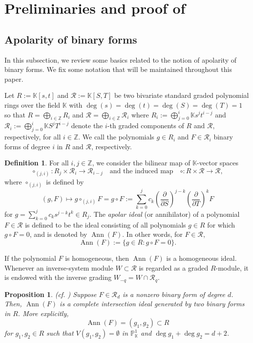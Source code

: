 \documentclass[a4paper, 11pt]{amsart}
\numberwithin{theorem}{section}
\newtheorem{proposition}[theorem]{Proposition}
\theoremstyle{definition}
\newtheorem{definition}[theorem]{Definition}
\numberwithin{equation}{section}
\DeclareMathOperator{\Ann}{\operatorname{Ann}}
\begin{document}
\section{Preliminaries and proof of }\label{sec:prel and main}
\subsection{Apolarity of binary forms}\label{subsec:apolarity}
In this subsection, we review some basics related to the notion of apolarity of binary forms. 
We fix some notation that will be maintained throughout this paper. 
 
Let $R:= \mathbb{K}[s,t]$ and $\mathcal{R}:= \mathbb{K}[S,T]$ be two bivariate standard graded polynomial rings over the field $\mathbb{K}$ with $\deg(s) = \deg(t) = \deg(S) = \deg(T) = 1$ so that $R = \bigoplus_{i\in \mathbb{Z}} R_i$ and $\mathcal{R} = \bigoplus_{i\in \mathbb{Z}} \mathcal{R}_i$ where $R_i := \bigoplus_{j = 0}^{i}\mathbb{K}s^jt^{i-j}$ and $\mathcal{R}_i := \bigoplus_{j = 0}^{i}\mathbb{K}S^jT^{i-j}$ denote the $i$-th graded components of $R$ and $\mathcal{R}$, respectively, for all $i\in \mathbb{Z}$. 
We call the polynomials $g\in R_i$ and $F \in \mathcal{R}_i$ binary forms of degree $i$ in $R$ and $\mathcal{R}$, respectively. 

\begin{definition}
For all $i,j\in \mathbb{Z}$, we consider the bilinear map of $\mathbb{K}$-vector spaces
\[
\circ_{(j,i)}:R_j\times \mathcal{R}_i \longrightarrow \mathcal{R}_{i-j} \quad\text{and the induced map}\quad \circ: R \times \mathcal{R} \longrightarrow \mathcal{R},
\]
where $\circ_{(j,i)}$ is defined by
\[
(g,F) \longmapsto g\circ_{(j,i)} F = g \circ F := \sum_{k=0}^j c_k\left(\frac{\partial}{\partial S}\right)^{j-k}\left(\frac{\partial}{\partial T}\right)^k F
\]
for $g=\sum_{k=0}^jc_k s^{j-k}t^k \in R_j$. 
The \textit{apolar ideal} (or annihilator) of a polynomial $F \in \mathcal{R}$ is defined to be the ideal consisting of all polynomials $g \in R$ for which $g \circ F = 0$, and is denoted by $\Ann(F)$.  
In other words, for $F\in\mathcal{R}$,
\[
\Ann(F) := \{g \in R : g \circ F = 0\}.
\]
\end{definition}
If the polynomial $F$ is homogeneous, then $\Ann(F)$ is a homogeneous ideal. Whenever an inverse-system module \(W\subset\mathcal R\) is regarded as a graded \(R\)-module, it is endowed with the inverse grading \(W_{-q}=W\cap\mathcal R_q\).

\begin{proposition} (cf. \cite[Theorem 1.44]{MR1735271})
    Suppose $F \in \mathcal{R}_d$ is a nonzero binary form of degree $d$. 
    Then, $\Ann(F)$ is a complete intersection ideal generated by two binary forms in $R$. 
    More explicitly,
    \[
    \Ann(F) = (g_1, g_2) \subset R
    \]
    for $g_1, g_2 \in R$ such that $V(g_1, g_2) = \emptyset$ in $\mathbb{P}_{\mathbb{K}}^1$ and $\deg g_1 + \deg g_2 = d + 2$. 
\end{proposition}
\end{document}
